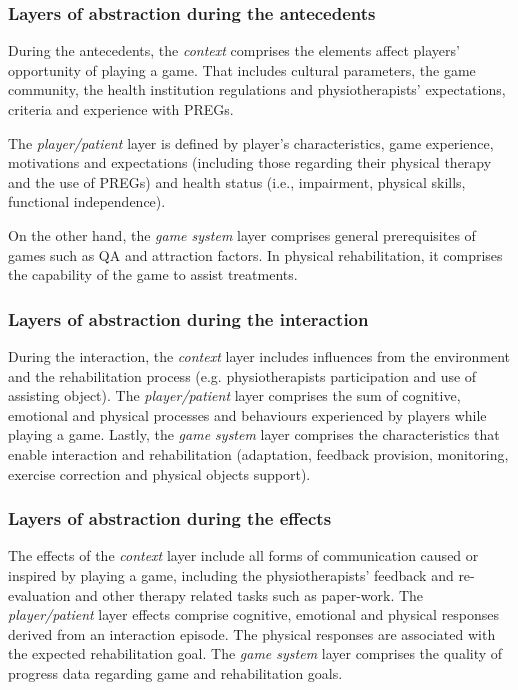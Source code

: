 \subsubsection*{Layers of abstraction during the antecedents}
During the antecedents, the \textit{context} comprises the elements affect players' opportunity of playing a game. That includes cultural parameters, the game community, the health institution regulations and physiotherapists' expectations, criteria and experience with \acp{PREG}.

The \textit{player/patient} layer is defined by player's characteristics, game experience, motivations and expectations (including those regarding their physical therapy and the use of \acp{PREG}) and health status (i.e., impairment, physical skills, functional independence). 

On the other hand, the \textit{game system} layer comprises general prerequisites of games such as \ac{QA} and attraction factors. In physical rehabilitation, it comprises the capability of the game to assist treatments.

\subsubsection*{Layers of abstraction during the interaction}
During the interaction, the \textit{context} layer includes influences from the environment and the rehabilitation process (e.g. physiotherapists participation and use of assisting object). The \textit{player/patient} layer comprises the sum of cognitive, emotional and physical processes and behaviours experienced by players while playing a game. Lastly, the \textit{game system} layer comprises the characteristics that enable interaction and rehabilitation (adaptation, feedback provision, monitoring, exercise correction and physical objects support).

\subsubsection*{Layers of abstraction during the effects}
The effects of the \textit{context} layer include all forms of communication caused or inspired by playing a game, including the physiotherapists' feedback and re-evaluation and other therapy related tasks such as paper-work. The \textit{player/patient} layer effects comprise cognitive, emotional and physical responses derived from an interaction episode. The physical responses are associated with the expected rehabilitation goal. The \textit{game system} layer comprises the quality of progress data regarding game and rehabilitation goals.

